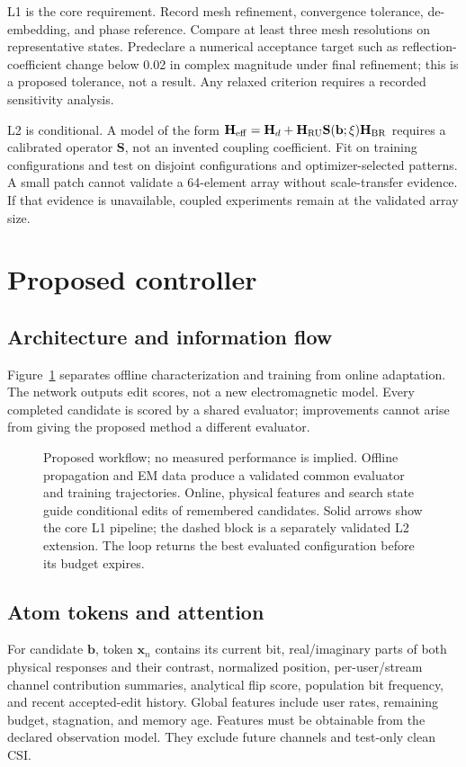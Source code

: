 \documentclass[conference]{IEEEtran}
\newcommand{\bvec}{\mathbf b}
\begin{document}
L1 is the core requirement. Record mesh refinement, convergence tolerance, de-embedding, and phase reference. Compare at least three mesh resolutions on representative states. Predeclare a numerical acceptance target such as reflection-coefficient change below 0.02 in complex magnitude under final refinement; this is a proposed tolerance, not a result. Any relaxed criterion requires a recorded sensitivity analysis.

L2 is conditional. A model of the form
$\mathbf H_{\rm eff}=\mathbf H_d+\mathbf H_{\rm RU}\mathbf S(\bvec;\xi)\mathbf H_{\rm BR}$
requires a calibrated operator $\mathbf S$, not an invented coupling coefficient. Fit on training configurations and test on disjoint configurations and optimizer-selected patterns. A small patch cannot validate a 64-element array without scale-transfer evidence. If that evidence is unavailable, coupled experiments remain at the validated array size.

\section{Proposed controller}
\subsection{Architecture and information flow}
Figure~\ref{fig:framework} separates offline characterization and training from online adaptation. The network outputs edit scores, not a new electromagnetic model. Every completed candidate is scored by a shared evaluator; improvements cannot arise from giving the proposed method a different evaluator.

\begin{figure}[t]
\centering

\caption{Proposed workflow; no measured performance is implied. Offline propagation and EM data produce a validated common evaluator and training trajectories. Online, physical features and search state guide conditional edits of remembered candidates. Solid arrows show the core L1 pipeline; the dashed block is a separately validated L2 extension. The loop returns the best evaluated configuration before its budget expires.}
\label{fig:framework}
\end{figure}

\subsection{Atom tokens and attention}
For candidate $\bvec$, token $\mathbf x_n$ contains its current bit, real/imaginary parts of both physical responses and their contrast, normalized position, per-user/stream channel contribution summaries, analytical flip score, population bit frequency, and recent accepted-edit history. Global features include user rates, remaining budget, stagnation, and memory age. Features must be obtainable from the declared observation model. They exclude future channels and test-only clean CSI.
\end{document}

